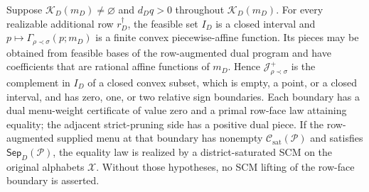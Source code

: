 Suppose \(\mathcal K_D(m_D)\ne\varnothing\) and \(d_Dq>0\) throughout \(\mathcal K_D(m_D)\). For every realizable additional row \(r_D^\dagger\), the feasible set \(I_D\) is a closed interval and \(p\mapsto\Gamma_{\rho\prec\sigma}(p;m_D)\) is a finite convex piecewise-affine function. Its pieces may be obtained from feasible bases of the row-augmented dual program and have coefficients that are rational affine functions of \(m_D\). Hence \(\mathcal J_{\rho\prec\sigma}^+\) is the complement in \(I_D\) of a closed convex subset, which is empty, a point, or a closed interval, and has zero, one, or two relative sign boundaries. Each boundary has a dual menu-weight certificate of value zero and a primal row-face law attaining equality; the adjacent strict-pruning side has a positive dual piece. If the row-augmented supplied menu at that boundary has nonempty \(\mathcal C_{\mathrm{sat}}(\mathcal P)\) and satisfies \(\mathsf{Sep}_D(\mathcal P)\), the equality law is realized by a district-saturated SCM on the original alphabets \(\mathcal X\). Without those hypotheses, no SCM lifting of the row-face boundary is asserted.